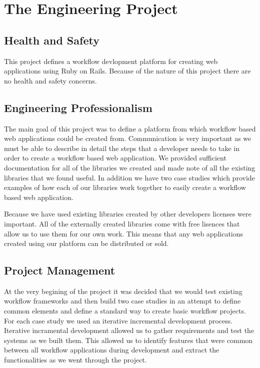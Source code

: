 \documentclass[document.tex]{subfiles}
\begin{document}
\chapter{The Engineering Project}
\label {ch:engineering}

\section{Health and Safety}

This project defines a workflow devlopment platform for creating web applications using Ruby on Rails. Because of the nature of this project there are no health and safety concerns.

\section{Engineering Professionalism}

The main goal of this project was to define a platform from which workflow based web applications could be created from. Communication is very important as we must be able to describe in detail the steps that a developer needs to take in order to create a workflow based web application. We provided sufficient documentation for all of the libraries we created and made note of all the existing libraries that we found useful. In addition we have two case studies which provide examples of how each of our libraries work together to easily create a workflow based web application.

Because we have used existing libraries created by other developers licenses were important. All of the externally created libraries come with free lisences that allow us to use them for our own work. This means that any web applications created using our platform can be distributed or sold.

\section{Project Management}

At the very begining of the project it was decided that we would test existing workflow frameworks and then build two case studies in an attempt to define common elements and define a standard way to create basic workflow projects. For each case study we used an iterative incremental development process. Iterative incramental development allowed us to gather requirements and test the systems as we built them. This allowed us to identify features that were common between all workflow applications during development and extract the functionalities as we went through the project.
\end{document}

